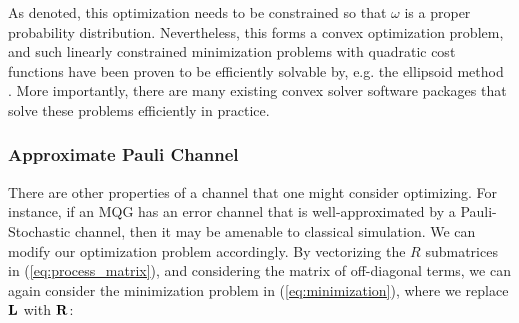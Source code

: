 \documentclass[aps,nofootinbib,pra,notitlepage,twocolumn]{revtex4-1}
\begin{document}
As denoted, this optimization needs to be constrained so that $\omega$ is a proper probability distribution. Nevertheless, this forms a convex optimization problem, and such linearly constrained minimization problems with quadratic cost functions have been proven to be efficiently solvable by, e.g. the ellipsoid method \cite{wright1999numerical, khachiyan}. More importantly, there are many existing convex solver software packages that solve these problems efficiently in practice.






\subsubsection{Approximate Pauli Channel} %
\label{sub:off_diagonals}
There are other properties of a channel that one might consider optimizing. For instance, if an MQG has an error channel that is well-approximated by a Pauli-Stochastic channel, then it may be amenable to classical simulation. We can modify our optimization problem accordingly. By vectorizing the $R$ submatrices in (\ref{eq:process_matrix}), and considering the matrix of off-diagonal terms, we can again consider the minimization problem in (\ref{eq:minimization}), where we replace $\bold{L}$ with $\bold{R}$:
\end{document}
